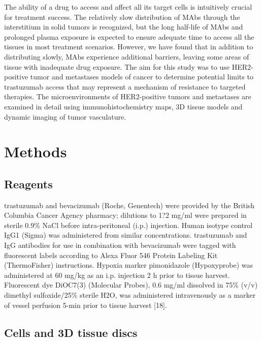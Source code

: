 The ability of a drug to access and affect all its target cells is intuitively crucial for treatment success.
The relatively slow distribution of MAbs through the interstitium in solid tumors is recognized, but the long half-life of MAbs and prolonged plasma exposure is expected to ensure adequate time to access all the tissues in most treatment scenarios.
However, we have found that in addition to distributing slowly, MAbs experience additional barriers, leaving some areas of tissue with inadequate drug exposure.
The aim for this study was to use HER2-positive tumor and metastases models of cancer to determine potential limits to trastuzumab access that may represent a mechanism of resistance to targeted therapies.
The microenvironments of HER2-positive tumors and metastases are examined in detail using immunohistochemistry maps, 3D tissue models and dynamic imaging of tumor vasculature.

\section{Methods}

\subsection{Reagents}

trastuzumab and bevacizumab (Roche, Genentech) were provided by the British Columbia Cancer Agency pharmacy; dilutions to 1?2 mg/ml were prepared in sterile 0.9\% NaCl before intra-peritoneal (i.p.) injection.
Human isotype control IgG1 (Sigma) was administered from similar concentrations.
trastuzumab and IgG antibodies for use in combination with bevacizumab were tagged with fluorescent labels according to Alexa Fluor 546 Protein Labeling Kit (ThermoFisher) instructions.
Hypoxia marker pimonidazole (Hypoxyprobe) was administered at 60 mg/kg as an i.p.
injection 2 h prior to tissue harvest.
Fluorescent dye DiOC7(3) (Molecular Probes), 0.6 mg/ml dissolved in 75\% (v/v) dimethyl sulfoxide/25\% sterile H2O, was administered intravenously as a marker of vessel perfusion 5-min prior to tissue harvest [18].

\subsection{Cells and 3D tissue discs}

